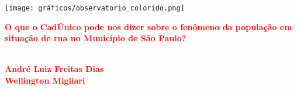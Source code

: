 \documentclass[14pt]{extarticle}
\begin{document}
\thispagestyle{empty}

\texttt{[image: gráficos/observatorio\_colorido.png]}



\begin{center}
\vspace{5cm}
{\textcolor{red}{\Large\textbf{O que o CadÚnico pode nos dizer sobre o fenômeno da população em situação de rua no Município de São Paulo?}}}\\
\vspace{0.1cm}
{\textcolor{red}{\Large\textsc{}}}\\
\vspace{0.1cm}
{\textcolor{red}{\Large\textsc{}}}
\vspace{0.1cm}
{\textcolor{red}{\Large\textsc{}}}
\end{center}

\vspace{6cm}

\hfill%
\begin{minipage}[t]{14cm}
\begin{flushright}
{\textcolor{red}{\large\textbf{André Luiz Freitas Dias}}}\\
\vspace{0.2cm}
{\textcolor{red}{\large\textbf{Wellington Migliari}}}\\
\vspace{0.8cm}
\end{flushright}
\end{minipage}

\vspace{4.5cm}
\noindent{}
\restoregeometry
\newpage

\thispagestyle{empty}
\end{document}

